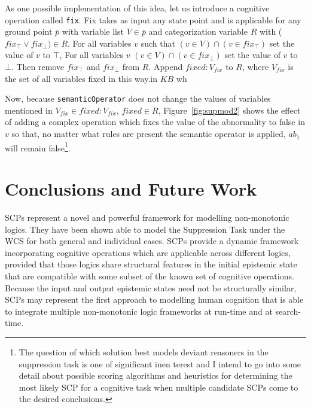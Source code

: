 \documentclass{article}
\begin{document}
 As one possible implementation of this idea, let us introduce a cognitive operation called \texttt{fix}. Fix takes as input any state point and is applicable for any ground point $\bar{p}$ with variable list $V \in \bar{p}$ and categorization variable $R$ with ($fix_\top \lor fix_\bot) \in R$. For all variables $v$ such that $(v \in V) \cap (v \in fix_\top)$ set the value of $v$ to $\top$, For all variables $v$ $(v \in V) \cap (v \in fix_\bot)$ set the value of $v$ to $\bot$. Then remove $fix_\top$ and $fix_\bot$ from $R$. Append $fixed:V_{fix}$ to $R$, where $V_{fix}$ is the set of all variables fixed in this way.in $KB$ wh

Now, because \texttt{semanticOperator} does not change the values of variables mentioned in $V_{fix} \in fixed:V_{fix}$, $fixed \in R$, Figure~\ref{fig:supmod2} shows the effect of adding a complex operation which fixes the value of the abnormality to false in $v$ so that, no matter what rules are present the semantic operator is applied, $ab_1$ will remain false\footnote{The question of which solution best models deviant reasoners in the suppression task is one of significant inen terest and I intend to go into some detail about possible scoring algorithms and heuristics for determining the most likely SCP for a cognitive task when multiple candidate SCPs come to the desired conclusions.}.

\section{Conclusions and Future Work} \label{sec:conc}
SCPs represent a novel and powerful framework for modelling non-monotonic logics. They have been shown able to model the Suppression Task under the WCS for both general and individual cases. SCPs provide a dynamic framework incorporating cognitive operations which are applicable across different logics, provided that those logics share structural features in the initial epistemic state that are compatible with some subset of the known set of cognitive operations. Because the input and output epistemic states need not be structurally similar, SCPs may represent the first approach to modelling human cognition that is able to integrate multiple non-monotonic logic frameworks at run-time and at search-time.
\end{document}
